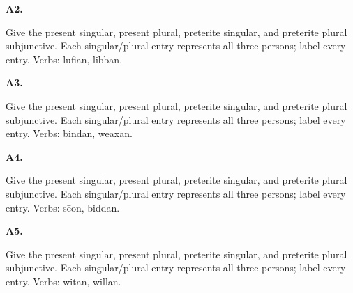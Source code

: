 \par\begin{minipage}{\linewidth}\raggedright
\textbf{A2.}

Give the present singular, present plural, preterite singular, and preterite plural subjunctive. Each singular/\allowbreak{}plural entry represents all three persons; label every entry. Verbs: lufian, libban.

\end{minipage}\par\addvspace{4pt}

\par\begin{minipage}{\linewidth}\raggedright
\textbf{A3.}

Give the present singular, present plural, preterite singular, and preterite plural subjunctive. Each singular/\allowbreak{}plural entry represents all three persons; label every entry. Verbs: bindan, weaxan.

\end{minipage}\par\addvspace{4pt}

\par\begin{minipage}{\linewidth}\raggedright
\textbf{A4.}

Give the present singular, present plural, preterite singular, and preterite plural subjunctive. Each singular/\allowbreak{}plural entry represents all three persons; label every entry. Verbs: sēon, biddan.

\end{minipage}\par\addvspace{4pt}

\par\begin{minipage}{\linewidth}\raggedright
\textbf{A5.}

Give the present singular, present plural, preterite singular, and preterite plural subjunctive. Each singular/\allowbreak{}plural entry represents all three persons; label every entry. Verbs: witan, willan.

\end{minipage}\par\addvspace{4pt}

